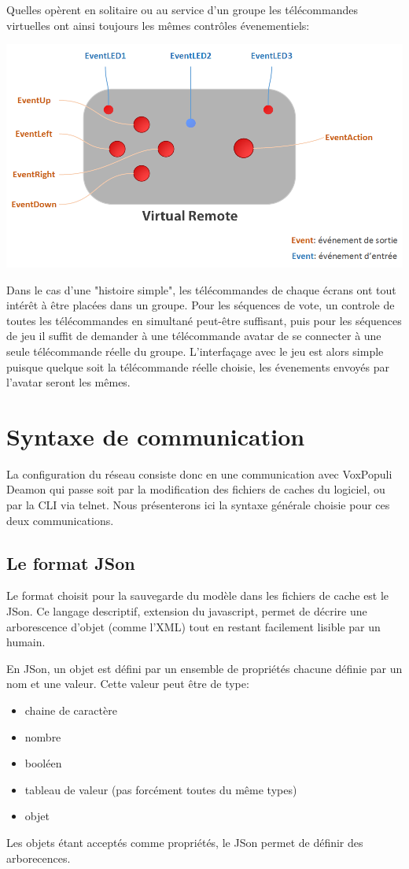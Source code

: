 \documentclass{Rapport}
\begin{document}
Quelles opèrent en solitaire ou au service d'un groupe les télécommandes virtuelles ont ainsi toujours les mêmes contrôles évenementiels:

\includegraphics[width=0.8\columnwidth]{rsc/diaVirtualRemote}


Dans le cas d'une "histoire simple", les télécommandes de chaque écrans ont tout intérêt à être placées dans un groupe. Pour les séquences de vote, un controle de toutes les télécommandes en simultané peut-être suffisant, puis pour les séquences de jeu il suffit de demander à une télécommande avatar de se connecter à une seule télécommande réelle du groupe. L'interfaçage avec le jeu est alors simple puisque quelque soit la télécommande réelle choisie, les évenements envoyés par l'avatar seront les mêmes.


\section{Syntaxe de communication}

La configuration du réseau consiste donc en une communication avec VoxPopuli Deamon qui passe soit par la modification des fichiers de caches du logiciel, ou par la CLI via telnet. Nous présenterons ici la syntaxe générale choisie pour ces deux communications.

\subsection*{Le format JSon}
Le format choisit pour la sauvegarde du modèle dans les fichiers de cache est le JSon. Ce langage descriptif, extension du javascript, permet de décrire une arborescence d'objet (comme l'XML) tout en restant facilement lisible par un humain.

En JSon, un objet est défini par un ensemble de propriétés chacune définie par un nom et une valeur. Cette valeur peut être de type:
\begin{itemize}
	\item chaine de caractère
	\item nombre
	\item booléen
	\item tableau de valeur (pas forcément toutes du même types)
	\item objet
\end{itemize}
Les objets étant acceptés comme propriétés, le JSon permet de définir des arborecences.
\end{document}
